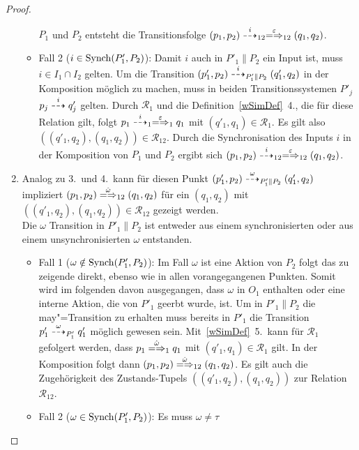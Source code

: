 \begin{proof}
\begin{enumerate}
\begin{itemize}
          $P_1$ und $P_2$ entsteht die Transitionsfolge $(p_1,p_2)\may[i]_{12}
          \weakmay[\varepsilon]_{12} (q_1,q_2)$.
        \item Fall 2 ($i\in\mathrm{Synch} (P'_1,P_2)$): Damit $i$ auch in
          $P'_1\|P_2$ ein Input ist, muss $i\in I_1\cap I_2$ gelten. Um die
          Transition $(p'_1,p_2)\may[i]_{P'_1\|P_2}(q'_1,q_2)$ in der
          Komposition möglich zu machen, muss in beiden Transitionssystemen
          $P'_j$ $p_j \may[i] q'_j$ gelten. Durch $\mathcal{R}_1$ und
          die Definition~\ref{wSimDef}~4., die für diese Relation gilt, folgt
          $p_1\may[i]_1 \weakmay[\varepsilon]_1 q_1$ mit
          $(q'_1,q_1)\in\mathcal{R}_1$. Es gilt also $((q'_1,q_2),(q_1,q_2))
          \in \mathcal{R}_{12}$. Durch die Synchronisation des Inputs $i$ in
          der Komposition von $P_1$ und $P_2$ ergibt sich $(p_1,p_2)
          \may[i]_{12} \weakmay[\varepsilon]_{12} (q_1,q_2)$.
      \end{itemize}
    \item Analog zu 3.\ und 4.\ kann für diesen Punkt $(p'_1,p_2)
      \may[\omega]_{P'_1\|P_2} (q'_1,q_2)$ impliziert $(p_1,p_2)
      \weakmay[\hat{\omega}]_{12} (q_1,q_2)$ für ein $(q_1,q_2)$ mit
      $((q'_1,q_2),(q_1,q_2))\in\mathcal{R}_{12}$ gezeigt werden.\\
      Die $\omega$ Transition in $P'_1\|P_2$ ist entweder aus einem
      synchronisierten oder aus einem unsynchronisierten $\omega$ entstanden.
      \begin{itemize}
        \item Fall 1 ($\omega\notin\mathrm{Synch} (P'_1,P_2)$): Im Fall $\omega$ ist
          eine Aktion von $P_2$ folgt das zu zeigende direkt, ebenso wie in
          allen vorangegangenen Punkten. Somit wird im folgenden davon
          ausgegangen, dass $\omega$ in $O_1$ enthalten oder eine interne
          Aktion, die von $P'_1$ geerbt wurde, ist. Um in $P'_1\|P_2$ die
          may"=Transition zu erhalten muss bereits in $P'_1$ die Transition
          $p'_1 \may[\omega]_{P'_1} q'_1$ möglich gewesen sein.
          Mit~\ref{wSimDef}~5.\ kann für $\mathcal{R}_1$ gefolgert werden, dass
          $p_1 \weakmay[\hat{\omega}]_1 q_1$ mit $(q'_1,q_1) \in \mathcal{R}_1$
          gilt. In der Komposition folgt dann $(p_1,p_2)
          \weakmay[\hat{\omega}]_{12} (q_1,q_2)$. Es gilt auch die
          Zugehörigkeit des Zustands-Tupels $((q'_1,q_2),(q_1,q_2))$ zur
          Relation $\mathcal{R}_{12}$.
        \item Fall 2 ($\omega\in\mathrm{Synch} (P'_1,P_2)$): Es muss $\omega\neq\tau$

\end{itemize}
\end{enumerate}
\end{proof}

